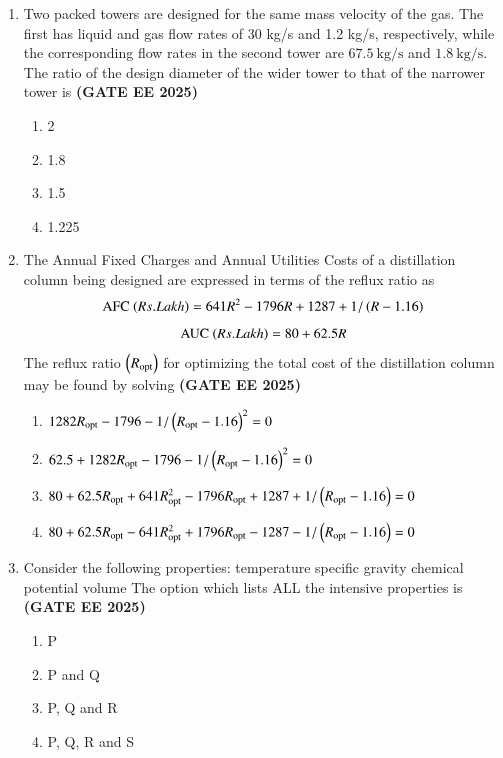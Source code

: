 \documentclass[journal,12pt,onecolumn]{IEEEtran}
\theoremstyle{remark}
\begin{document}
\begin{enumerate}
\item  Two packed towers are designed for the same mass velocity of the gas. The first has liquid and gas flow rates of 30 kg/s and 1.2 kg/s, respectively, while the corresponding flow rates in the second tower are $67.5~\text{kg/s}$ and $1.8~\text{kg/s}$. The ratio of the design diameter of the wider tower to that of the narrower tower is
\hfill \textbf{(GATE EE 2025)} \begin{enumerate}
    \item 2
    \item 1.8
    \item 1.5
    \item 1.225
\end{enumerate}

\item The Annual Fixed Charges  and Annual Utilities Costs  of a distillation column being designed are expressed in terms of the reflux ratio  as
\[ \text{AFC \ensuremath{\left(Rs. Lakh\right)}} = 641 R^{2}-1796 R+1287+1/\left(R-1.16\right) \]
\[ \text{AUC \ensuremath{\left(Rs. Lakh\right)}} = 80+62.5 R \]
The reflux ratio $\left(R_{\text{opt}}\right)$ for optimizing the total cost of the distillation column may be found by solving
\hfill \textbf{(GATE EE 2025)} \begin{enumerate}
    \item $1282 R_{\text{opt}}-1796-1/\left(R_{\text{opt}}-1.16\right)^{2}=0$
    \item $62.5+1282 R_{\text{opt}}-1796-1/\left(R_{\text{opt}}-1.16\right)^{2}=0$
    \item $80+62.5 R_{\text{opt}}+641 R_{\text{opt}}^{2}-1796 R_{\text{opt}}+1287+1/\left(R_{\text{opt}}-1.16\right)=0$
    \item $80+62.5 R_{\text{opt}}-641 R_{\text{opt}}^{2}+1796 R_{\text{opt}}-1287-1/\left(R_{\text{opt}}-1.16\right)=0$
\end{enumerate}

\item Consider the following properties:
 temperature
 specific gravity
 chemical potential
 volume
The option which lists ALL the intensive properties is
\hfill \textbf{(GATE EE 2025)} \begin{enumerate}
    \item P
    \item P and Q
    \item P, Q and R
    \item P, Q, R and S
	    
\end{enumerate}



\end{enumerate}
\end{document}

